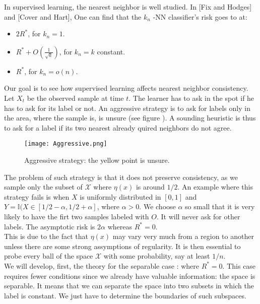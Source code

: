 \documentclass[onecolumn,12pt]{article}
\begin{document}
In supervised learning, the nearest neighbor is well studied. In [Fix and Hodges] and [Cover and Hart], One can find that the $k_n$ -NN classifier’s risk goes to at:
\begin{itemize}
\item $ 2R^*$, for $k_n=1$.

\item $R^*+O(\frac{1}{\sqrt{k}})$, for $k_n=k$ constant.

\item $R^*$, for $k_n=o(n)$.

\end{itemize}


Our goal is to see how supervised learning affects nearest neighbor consistency. Let $X_t$ be the observed sample at time $t$. The learner has to ask in the spot if he has to ask for its label or not. An aggressive strategy is to ask for labels only in the area, where the sample is, is unsure (see figure ). A sounding heuristic is thus to ask for a label if its two nearest already quired neighbors do not agree.
\begin{figure}[]
	\centering
	\caption{Aggressive strategy: the yellow point is unsure.}
    \texttt{[image: Aggressive.png]}
\end{figure}

The problem of such strategy is that it does not preserve consistency, as we sample only the subset of $\mathscr{X}$ where $\eta(x)$ is around $1/2$. An example where this strategy fails is when $X$ is uniformly distributed in $[0,1]$ and $Y=\mathbb{I}(X \in [1/2 - \alpha,1/2 + \alpha]$, where $\alpha>0$. We choose $\alpha$ so small that it is very likely to have the firt two samples labeled with $O$. It will never ask for other labels. The asymptotic risk is $2\alpha$ whereas $R^*=0$.\\

This is due to the fact that $\eta(x)$ may vary very much from a region to another unless there are some strong assymptions of regularity. It is then essential to probe every ball of the space $\mathscr{X}$ with some probability, say at least $1/n$.\\


We will develop, first, the theory for the separable case : where $R^*=0$. This case requires fewer conditions since we already have valuable information: the space is separable. It means that we can separate the space into two subsets in which the label is constant. We just have to determine the boundaries of such subspaces.\\
\end{document}
